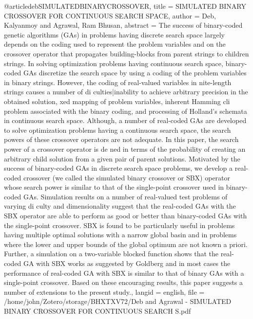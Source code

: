 \begin{thebibliography}
@article{debSIMULATEDBINARYCROSSOVER,
  title = {{{SIMULATED BINARY CROSSOVER FOR CONTINUOUS SEARCH SPACE}}},
  author = {Deb, Kalyanmoy and Agrawal, Ram Bhusan},
  abstract = {The success of binary-coded genetic algorithms (GAs) in problems having discrete search space largely depends on the coding used to represent the problem variables and on the crossover operator that propagates building-blocks from parent strings to children strings. In solving optimization problems having continuous search space, binary-coded GAs discretize the search space by using a coding of the problem variables in binary strings. However, the coding of real-valued variables in nite-length strings causes a number of di culties|inability to achieve arbitrary precision in the obtained solution, xed mapping of problem variables, inherent Hamming cli problem associated with the binary coding, and processing of Holland's schemata in continuous search space. Although, a number of real-coded GAs are developed to solve optimization problems having a continuous search space, the search powers of these crossover operators are not adequate. In this paper, the search power of a crossover operator is de ned in terms of the probability of creating an arbitrary child solution from a given pair of parent solutions. Motivated by the success of binary-coded GAs in discrete search space problems, we develop a real-coded crossover (we called the simulated binary crossover or SBX) operator whose search power is similar to that of the single-point crossover used in binary-coded GAs. Simulation results on a number of real-valued test problems of varying di culty and dimensionality suggest that the real-coded GAs with the SBX operator are able to perform as good or better than binary-coded GAs with the single-point crossover. SBX is found to be particularly useful in problems having multiple optimal solutions with a narrow global basin and in problems where the lower and upper bounds of the global optimum are not known a priori. Further, a simulation on a two-variable blocked function shows that the real-coded GA with SBX works as suggested by Goldberg and in most cases the performance of real-coded GA with SBX is similar to that of binary GAs with a single-point crossover. Based on these encouraging results, this paper suggests a number of extensions to the present study.},
  langid = {english},
  file = {/home/john/Zotero/storage/BHXTXV72/Deb and Agrawal - SIMULATED BINARY CROSSOVER FOR CONTINUOUS SEARCH S.pdf}
}


\end{thebibliography}
